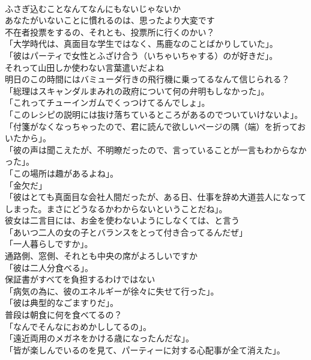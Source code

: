 \documentclass[8pt]{extreport}
\begin{document}
\begin{CJK}{UTF8}{min}
\\	ふさぎ込むことなんてなんにもないじゃないか	
\\	あなたがいないことに慣れるのは、思ったより大変です	
\\	不在者投票をするの、それとも、投票所に行くのかい？	
\\	「大学時代は、真面目な学生ではなく、馬鹿なのことばかりしていた」。	
\\	「彼はパーティで女性とふざけ合う（いちゃいちゃする）のが好きだ」。	
\\	それって山田しか使わない言葉遣いだよね	
\\	明日のこの時間にはバミューダ行きの飛行機に乗ってるなんて信じられる？	
\\	「総理はスキャンダルまみれの政府について何の弁明もしなかった」。	
\\	「これってチューインガムでくっつけてるんでしょ」。	
\\	「このレシピの説明には抜け落ちているところがあるのでついていけないよ」。	
\\	「付箋がなくなっちゃったので、君に読んで欲しいページの隅（端）を折っておいたから」。	
\\	「彼の声は聞こえたが、不明瞭だったので、言っていることが一言もわからなかった」。	
\\	「この場所は趣があるよね」。	
\\	「金欠だ」	
\\	「彼はとても真面目な会社人間だったが、ある日、仕事を辞め大道芸人になってしまった。まさにどうなるかわからないということだね」。	
\\	彼女は二言目には、お金を使わないようにしなくては、と言う	
\\	「あいつ二人の女の子とバランスをとって付き合ってるんだぜ」	
\\	「一人暮らしですか」。	
\\	通路側、窓側、それとも中央の席がよろしいですか	
\\	「彼は二人分食べる」。	
\\	保証書がすべてを負担するわけではない	
\\	「病気の為に、彼のエネルギーが徐々に失せて行った」。	
\\	「彼は典型的なごますりだ」。	
\\	普段は朝食に何を食べてるの？	
\\	「なんでそんなにおめかししてるの」。	
\\	「遠近両用のメガネをかける歳になったんだな」。	
\\	「皆が楽しんでいるのを見て、パーティーに対する心配事が全て消えた」。	

\end{CJK}
\end{document}
